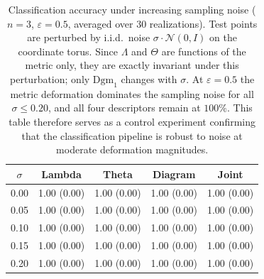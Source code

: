 \begin{table}[htbp]\centering
\caption{Classification accuracy under increasing sampling noise
(\(n=3\), \(\varepsilon=0.5\), averaged over 30 realizations). Test points
are perturbed by i.i.d.\ noise \(\sigma\cdot\mathcal{N}(0,I)\) on the
coordinate torus. Since \(\Lambda\) and \(\Theta\) are functions of the
metric only, they are exactly invariant under this perturbation; only
\(\mathrm{Dgm}_1\) changes with \(\sigma\). At \(\varepsilon=0.5\) the
metric deformation dominates the sampling noise for all \(\sigma\le 0.20\),
and all four descriptors remain at \(100\%\). This table therefore serves as
a control experiment confirming that the classification pipeline is
robust to noise at moderate deformation magnitudes.}
\label{tab:noise-robustness}
\begin{tabular}{c|cccc}\hline
\(\sigma\) & Lambda & Theta & Diagram & Joint \\\hline
0.00 & 1.00 (0.00) & 1.00 (0.00) & 1.00 (0.00) & 1.00 (0.00) \\
0.05 & 1.00 (0.00) & 1.00 (0.00) & 1.00 (0.00) & 1.00 (0.00) \\
0.10 & 1.00 (0.00) & 1.00 (0.00) & 1.00 (0.00) & 1.00 (0.00) \\
0.15 & 1.00 (0.00) & 1.00 (0.00) & 1.00 (0.00) & 1.00 (0.00) \\
0.20 & 1.00 (0.00) & 1.00 (0.00) & 1.00 (0.00) & 1.00 (0.00) \\
\hline\end{tabular}\end{table}